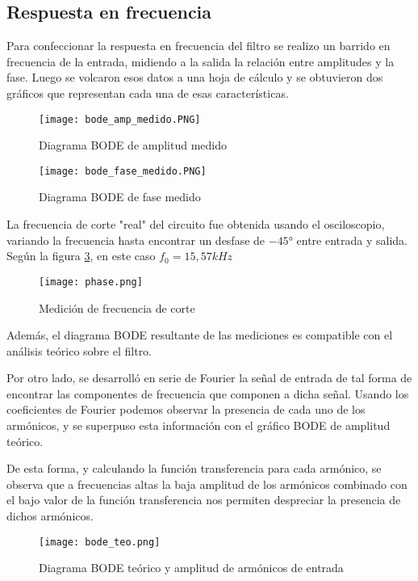 \subsection{Respuesta en frecuencia}

Para confeccionar la respuesta en frecuencia del filtro se realizo un barrido en frecuencia de la entrada, midiendo a la salida la relaci\'on entre amplitudes y la fase. Luego se volcaron esos datos a una hoja de c\'alculo y se obtuvieron dos gr\'aficos que representan cada una de esas caracter\'isticas.

\begin{figure}[h!]
    \centering
    \texttt{[image: bode\_amp\_medido.PNG]}
    \caption{Diagrama BODE de amplitud medido}
    \label{fig:bode_amp_medido_2} 
\end{figure}


\begin{figure}[h!]
    \centering
    \texttt{[image: bode\_fase\_medido.PNG]}
    \caption{Diagrama BODE de fase medido}
    \label{fig:bode_fase_medido_2} 
\end{figure}

La frecuencia de corte "real" del circuito fue obtenida usando el osciloscopio, variando la frecuencia hasta encontrar un desfase de $-45°$ entre entrada y salida. Seg\'un la figura \ref{fig:phase_2}, en este caso $f_{0}=15,57kHz$


\begin{figure}[h!]
    \centering
    \texttt{[image: phase.png]}
    \caption{Medici\'on de frecuencia de corte}
    \label{fig:phase_2} 
\end{figure}
Adem\'as, el diagrama BODE resultante de las mediciones es compatible con el an\'alisis te\'orico sobre el filtro.

Por otro lado, se desarroll\'o en serie de Fourier la se\~nal de entrada de tal forma de encontrar las componentes de frecuencia que componen a dicha se\~nal. Usando los coeficientes de Fourier podemos observar la presencia de cada uno de los arm\'onicos, y se superpuso esta informaci\'on con el gr\'afico BODE de amplitud teórico.

De esta forma, y calculando la funci\'on transferencia para cada arm\'onico, se observa que a frecuencias altas la baja amplitud de los arm\'onicos combinado con el bajo valor de la funci\'on transferencia nos permiten despreciar la presencia de dichos arm\'onicos.

\begin{figure}[h!]
    \centering
    \texttt{[image: bode\_teo.png]}
    \caption{Diagrama BODE te\'orico y amplitud de arm\'onicos de entrada}
    \label{fig:bode_amp_superp_2} 
\end{figure}

